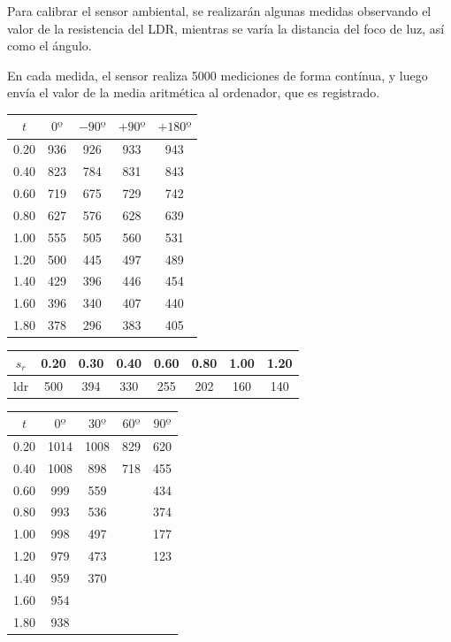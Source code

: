 \documentclass[10pt,a4paper,hidelinks]{article}
\begin{document}
\begin{multicols}{2}
Para calibrar el sensor ambiental, se realizarán algunas medidas observando el 
valor de la resistencia del LDR, mientras se varía la distancia del foco de luz, 
así como el ángulo.

En cada medida, el sensor realiza 5000 mediciones de forma contínua, y luego 
envía el valor de la media aritmética al ordenador, que es registrado.

\begin{center}
\begin{tabular}{ | c | c | c | c | c | }
\hline
$t$ & $0º$ & $-90º$ & $+90º$ & $+180º$ \\ \hline
0.20 & 936 & 926 & 933 & 943 \\ \hline
0.40 & 823 & 784 & 831 & 843 \\ \hline
0.60 & 719 & 675 & 729 & 742 \\ \hline
0.80 & 627 & 576 & 628 & 639 \\ \hline
1.00 & 555 & 505 & 560 & 531 \\ \hline
1.20 & 500 & 445 & 497 & 489 \\ \hline
1.40 & 429 & 396 & 446 & 454 \\ \hline
1.60 & 396 & 340 & 407 & 440 \\ \hline
1.80 & 378 & 296 & 383 & 405 \\ \hline
\end{tabular}
\end{center}

\begin{center}
\begin{tabular}{ *{8}{|c} | }
\hline
$s_{r}$ & 0.20 & 0.30 & 0.40 & 0.60 & 0.80 & 1.00 & 1.20 \\ \hline
ldr & 500 & 394 & 330 & 255 & 202 & 160 & 140 \\ \hline
\end{tabular}
\end{center}

\begin{center}
\begin{tabular}{ | c | c | c | c | c | }
\hline
$t$ & $0º$ & $30º$ & $60º$ & $90º$ \\ \hline
0.20 & 1014 & 1008 & 829 & 620 \\ \hline
0.40 & 1008 & 898 & 718 & 455 \\ \hline
0.60 & 999 & 559 &  & 434 \\ \hline
0.80 & 993 & 536 &  & 374 \\ \hline
1.00 & 998 & 497 &  & 177 \\ \hline
1.20 & 979 & 473 &  & 123 \\ \hline
1.40 & 959 & 370 &  &  \\ \hline
1.60 & 954 &  &  &  \\ \hline
1.80 & 938 &  &  &  \\ \hline
\end{tabular}
\end{center}


\end{multicols}
\end{document}
